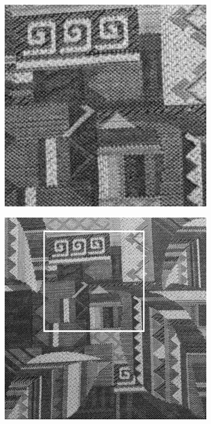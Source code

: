 \begin{figure}[!h]
\centering
\begin{subfigure}{0.39\linewidth}
  \centering
\includegraphics[width=\linewidth]{img/ch5/tex_zoom_in_stage_5.png}
\caption{}
\end{subfigure}
\begin{subfigure}{0.39\linewidth}
  \centering
\includegraphics[width=\linewidth]{img/ch5/tex_stage_5.png}

\end{subfigure}
\end{figure}
